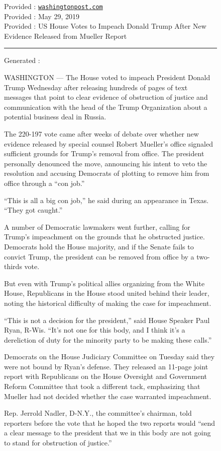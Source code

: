 \documentclass{article}
\begin{document}
\begin{figure}[t]
Provided \domainfield: {\tt\small \href{https://washingtonpost.com}{washingtonpost.com}} \\
Provided \datefield: May 29, 2019 \\
Provided \headlinefield: US House Votes to Impeach Donald Trump After New Evidence Released from Mueller Report

\hrule
Generated \bodyfield:
{\small
WASHINGTON — The House voted to impeach President Donald Trump Wednesday after releasing hundreds of pages of text messages that point to clear evidence of obstruction of justice and communication with the head of the Trump Organization about a potential business deal in Russia.

The 220-197 vote came after weeks of debate over whether new evidence released by special counsel Robert Mueller’s office signaled sufficient grounds for Trump’s removal from office. The president personally denounced the move, announcing his intent to veto the resolution and accusing Democrats of plotting to remove him from office through a “con job.”

“This is all a big con job,” he said during an appearance in Texas. “They got caught.”

A number of Democratic lawmakers went further, calling for Trump’s impeachment on the grounds that he obstructed justice. Democrats hold the House majority, and if the Senate fails to convict Trump, the president can be removed from office by a two-thirds vote.

But even with Trump’s political allies organizing from the White House, Republicans in the House stood united behind their leader, noting the historical difficulty of making the case for impeachment.

“This is not a decision for the president,” said House Speaker Paul Ryan, R-Wis. “It’s not one for this body, and I think it’s a dereliction of duty for the minority party to be making these calls.”

Democrats on the House Judiciary Committee on Tuesday said they were not bound by Ryan’s defense. They released an 11-page joint report with Republicans on the House Oversight and Government Reform Committee that took a different tack, emphasizing that Mueller had not decided whether the case warranted impeachment.

Rep. Jerrold Nadler, D-N.Y., the committee’s chairman, told reporters before the vote that he hoped the two reports would “send a clear message to the president that we in this body are not going to stand for obstruction of justice.”

}
\end{figure}
\end{document}
